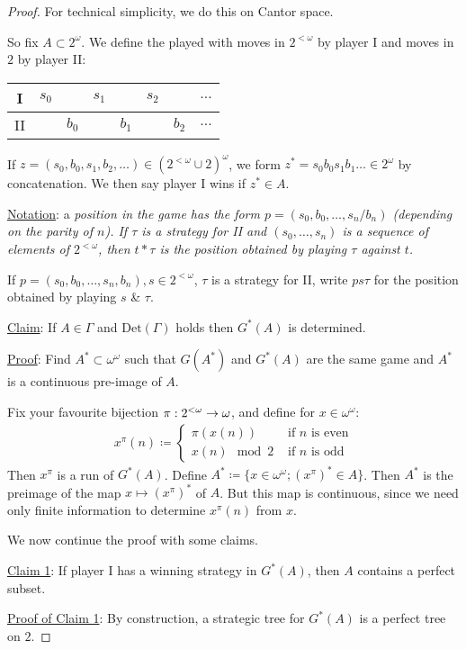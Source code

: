 \documentclass[]{article}
\newcommand{\om}{\omega}
\newcommand{\lom}{{<\omega}}
\newcommand{\Det}{\textrm{Det}}
\newcommand{\gamec}[2]{
    \begin{center}
        \begin{tabular}{c|ccccccc}
            I & $#1_0$ & & $#1_1$ & & $#1_2 $& & $\dots $\\ \hline
            II & & $#2_0$ & & $#2_1 $& &$ #2_2$ & $\dots$ 
        \end{tabular}
    \end{center}
}
\begin{document}
\begin{proof}
    For technical simplicity, we do this on Cantor space.

    So fix $A\subset 2^\om$. We define the  played with moves in $2^{\lom}$ by player I and moves in $2$ by player II:

    \gamec{s}{b}

    If $z = (s_0,b_0,s_1,b_2,\dots) \in (2^\lom \cup 2)^\om$, we form $z^\ast = s_0b_0s_1b_1\dots \in 2^\om$ by concatenation. We then say player I wins if $z^\ast \in A$.

    \underline{Notation}: a \it{position} in the game has the form $p = (s_0,b_0,\dots,s_n/b_n)$ (depending on the parity of $n$). If $\tau$ is a strategy for II and $(s_0,\dots,s_n)$ is a sequence of elements of $2^\lom$, then $t\ast \tau$ is the position obtained by playing $\tau$ against $t$.

    If $p = (s_0,b_0,\dots,s_n,b_n),s\in 2^\lom$, $\tau$ is a strategy for II, write $ps\tau$ for the position obtained by playing $s$ \& $\tau$.

    \underline{Claim}: If $A \in \Gamma$ and $\Det(\Gamma)$ holds then $G^\ast(A)$ is determined.

    \underline{Proof}: Find $A^\ast \subset \om^\om$ such that $G(A^\ast)$ and $G^\ast(A)$ are the same game and $A^\ast$ is a continuous pre-image of $A$.

    Fix your favourite bijection $\pi : 2^\lom \ra \om$, and define for $x \in \om^\om$:
    \begin{align*}
        x^\pi(n) \coloneqq \left\lbrace \begin{array}{cc}\pi(x(n))&\textrm{ if }n\textrm{ is even}\\ x(n)\mod 2&\textrm{ if }n\textrm{ is odd}\end{array}\right.
    \end{align*}
    Then $x^\pi$ is a run of $G^\ast(A)$. Define $A^\ast \coloneqq \{x\in\om^\om;(x^\pi)^\ast \in A\}$. Then $A^\ast$ is the preimage of the map $x\mapsto (x^\pi)^\ast$ of $A$. But this map is continuous, since we need only finite information to determine $x^\pi(n)$ from $x$. \qedsymbol

    We now continue the proof with some claims.

    \underline{Claim 1}: If player I has a winning strategy in $G^\ast(A)$, then $A$ contains a perfect subset.

    \underline{Proof of Claim 1}: By construction, a strategic tree for $G^\ast(A)$ is a perfect tree on $2$. \qedsymbol


\end{proof}
\end{document}
